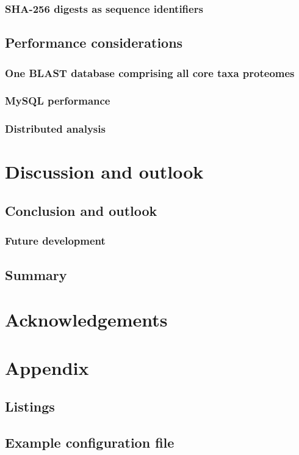 \documentclass[a4paper,12pt]{scrreprt}
\begin{document}
		\subsection{SHA-256 digests as sequence identifiers}
			
	\section{Performance considerations}
		\subsection{One BLAST database comprising all core taxa proteomes}
			
		\subsection{MySQL performance}
			
		\subsection{Distributed analysis}
			

\chapter{Discussion and outlook}
	
	\section{Conclusion and outlook}
		\subsection{Future development}
		
	\section{Summary}

%
{}
\chapter*{Acknowledgements}
	
	\clearpage

%
{}
\footnotesize


\normalsize
\clearpage

%
\appendix
\chapter{Appendix}
	\section{Listings}
		
	\section{Example configuration file}
		
\end{document}
